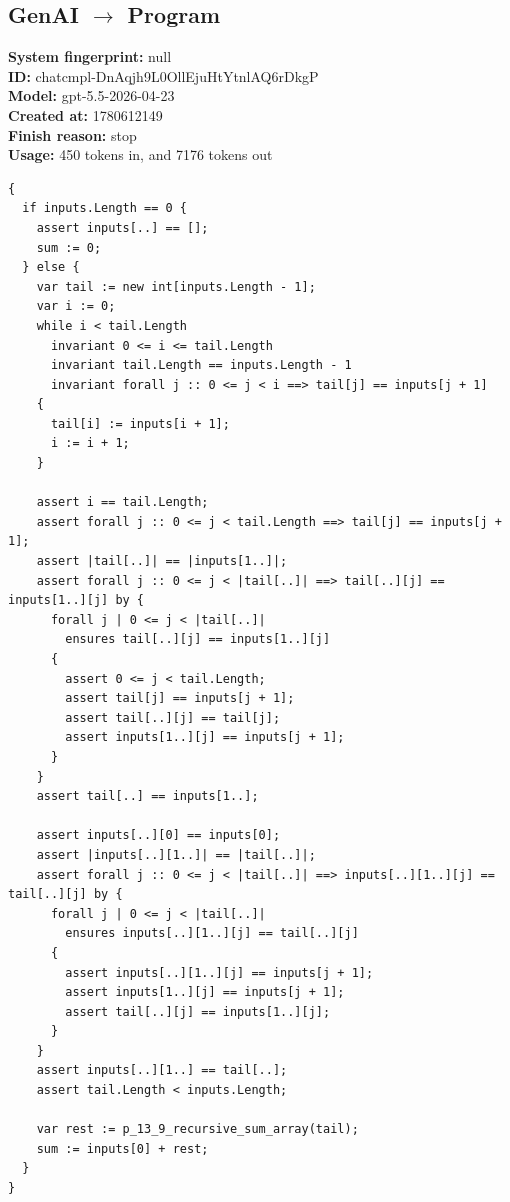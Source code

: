 \documentclass{article}
\begin{document}
\subsection*{GenAI $\rightarrow$ Program}
\textbf{System fingerprint: }null
\\\textbf{ID: }chatcmpl-DnAqjh9L0OllEjuHtYtnlAQ6rDkgP
\\\textbf{Model: }gpt-5.5-2026-04-23
\\\textbf{Created at: }1780612149
\\\textbf{Finish reason: }stop
\\\textbf{Usage: }450 tokens in, and 7176 tokens out
\begin{lstlisting}
{
  if inputs.Length == 0 {
    assert inputs[..] == [];
    sum := 0;
  } else {
    var tail := new int[inputs.Length - 1];
    var i := 0;
    while i < tail.Length
      invariant 0 <= i <= tail.Length
      invariant tail.Length == inputs.Length - 1
      invariant forall j :: 0 <= j < i ==> tail[j] == inputs[j + 1]
    {
      tail[i] := inputs[i + 1];
      i := i + 1;
    }

    assert i == tail.Length;
    assert forall j :: 0 <= j < tail.Length ==> tail[j] == inputs[j + 1];
    assert |tail[..]| == |inputs[1..]|;
    assert forall j :: 0 <= j < |tail[..]| ==> tail[..][j] == inputs[1..][j] by {
      forall j | 0 <= j < |tail[..]|
        ensures tail[..][j] == inputs[1..][j]
      {
        assert 0 <= j < tail.Length;
        assert tail[j] == inputs[j + 1];
        assert tail[..][j] == tail[j];
        assert inputs[1..][j] == inputs[j + 1];
      }
    }
    assert tail[..] == inputs[1..];

    assert inputs[..][0] == inputs[0];
    assert |inputs[..][1..]| == |tail[..]|;
    assert forall j :: 0 <= j < |tail[..]| ==> inputs[..][1..][j] == tail[..][j] by {
      forall j | 0 <= j < |tail[..]|
        ensures inputs[..][1..][j] == tail[..][j]
      {
        assert inputs[..][1..][j] == inputs[j + 1];
        assert inputs[1..][j] == inputs[j + 1];
        assert tail[..][j] == inputs[1..][j];
      }
    }
    assert inputs[..][1..] == tail[..];
    assert tail.Length < inputs.Length;

    var rest := p_13_9_recursive_sum_array(tail);
    sum := inputs[0] + rest;
  }
}
\end{lstlisting}
\end{document}
